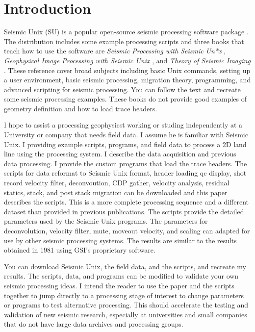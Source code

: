 \section{Introduction}
Seismic Unix (SU) is a popular open-source seismic processing software
package \cite[]{TLE16-07-10451049,cohen}.  The distribution
includes some example processing scripts and three books that
teach how to use the software are \emph{Seismic Processing with Seismic 
Un*x} \cite[]{forel}, \emph{Geophysical Image Processing with Seismic 
Unix} \cite[]{stockwell}, and \emph{Theory of Seismic Imaging} 
\cite[]{Scales} .  These reference cover broad subjects including basic 
Unix commands, setting up a user environment, basic seismic processing, 
migration theory, programming, and advanced scripting for seismic
processing.  You can follow the text and recreate some seismic
processing examples.  These books do not provide good examples of 
geometry definition and how to load trace headers.\nocite{cohen}

I hope to assist a processing geophysicst working or studing independently 
at a University or company that needs field data.  I assume he is familiar 
with Seismic Unix.  I providing example scripts,  programs, and field data 
to process a 2D land line using the processing system. I describe the data 
acquisition and previous data processing.  I provide the custom programs 
that load the trace headers.  The scripts for data reformat to Seismic 
Unix format, header loading qc display, shot record velocity filter, 
deconvoution, CDP gather, velocity analysis, residual statics, stack, 
and post stack migration can be downloaded and this paper describes 
the scripts.  This is a more complete processing sequence and a 
different dataset than provided in previous publications.  The scripts 
provide the detailed parameters used by the Seismic Unix programs.  The 
parameters for deconvolution, velocity filter, mute, moveout velocity, 
and scaling can adapted for use by other seismic processing  systems. The 
results are similar to the results obtained in 1981 using GSI's proprietary 
software.  

You can download Seismic Unix, the field data, and the scripts, and 
recreate my results.  The scripts, data, and programs can be modified 
to validate your own seismic processing ideas.  I intend the reader to 
use the paper and the scripts together to jump directly to a processing 
stage of interest to change parameters or programs to test alternative 
processing.  This should accelerate the testing and validation 
of new seismic research, especially at universities and small companies that 
do not have large data archives and processing groups.

